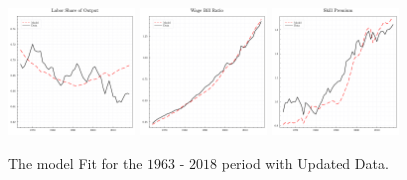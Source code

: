 \documentclass[12pt]{article}
\begin{document}
\begin{figure}[H]
 \centering
 \includegraphics[width=0.3\textwidth]{../images/fig:updated_estimation_ls_doc.pdf}
 \hfill
 \includegraphics[width=0.3\textwidth]{../images/fig:updated_estimation_wbr_doc.pdf}
 \hfill
 \includegraphics[width=0.3\textwidth]{../images/fig:updated_estimation_sp_doc.pdf}
 \caption{\label{fig:korv_estimation_extended} The model Fit for the $1963$ - $2018$ period with Updated Data.}
\end{figure}
\end{document}
